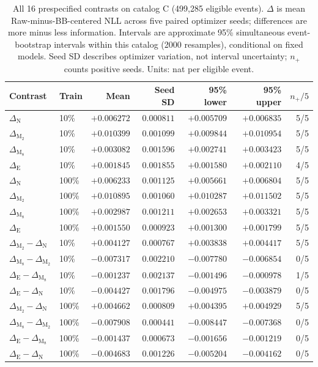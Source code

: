 \begin{table}[!htbp]
\centering
\normalsize
\setlength{\tabcolsep}{3pt}
\caption{All 16 prespecified contrasts on catalog C (499,285 eligible events). $\Delta$ is mean Raw-minus-BB-centered NLL across five paired optimizer seeds; differences are more minus less information. Intervals are approximate 95\% simultaneous event-bootstrap intervals within this catalog (2000 resamples), conditional on fixed models. Seed SD describes optimizer variation, not interval uncertainty; $n_+$ counts positive seeds. Units: nat per eligible event.}
\label{tab:information-C-primary16}
\begin{tabular}{llrrrrr}
\toprule
Contrast & Train & Mean & Seed SD & 95\% lower & 95\% upper & $n_+/5$ \\
\midrule
$\Delta_{\mathrm{N}}$ & 10\% & $+0.006272$ & $0.000811$ & $+0.005709$ & $+0.006835$ & 5/5 \\
$\Delta_{\mathrm{M_2}}$ & 10\% & $+0.010399$ & $0.001099$ & $+0.009844$ & $+0.010954$ & 5/5 \\
$\Delta_{\mathrm{M_8}}$ & 10\% & $+0.003082$ & $0.001596$ & $+0.002741$ & $+0.003423$ & 5/5 \\
$\Delta_{\mathrm{E}}$ & 10\% & $+0.001845$ & $0.001855$ & $+0.001580$ & $+0.002110$ & 4/5 \\
\midrule
$\Delta_{\mathrm{N}}$ & 100\% & $+0.006233$ & $0.001125$ & $+0.005661$ & $+0.006804$ & 5/5 \\
$\Delta_{\mathrm{M_2}}$ & 100\% & $+0.010895$ & $0.001060$ & $+0.010287$ & $+0.011502$ & 5/5 \\
$\Delta_{\mathrm{M_8}}$ & 100\% & $+0.002987$ & $0.001211$ & $+0.002653$ & $+0.003321$ & 5/5 \\
$\Delta_{\mathrm{E}}$ & 100\% & $+0.001550$ & $0.000923$ & $+0.001300$ & $+0.001799$ & 5/5 \\
\midrule
$\Delta_{\mathrm{M_2}}-\Delta_{\mathrm{N}}$ & 10\% & $+0.004127$ & $0.000767$ & $+0.003838$ & $+0.004417$ & 5/5 \\
$\Delta_{\mathrm{M_8}}-\Delta_{\mathrm{M_2}}$ & 10\% & $-0.007317$ & $0.002210$ & $-0.007780$ & $-0.006854$ & 0/5 \\
$\Delta_{\mathrm{E}}-\Delta_{\mathrm{M_8}}$ & 10\% & $-0.001237$ & $0.002137$ & $-0.001496$ & $-0.000978$ & 1/5 \\
$\Delta_{\mathrm{E}}-\Delta_{\mathrm{N}}$ & 10\% & $-0.004427$ & $0.001796$ & $-0.004975$ & $-0.003879$ & 0/5 \\
\midrule
$\Delta_{\mathrm{M_2}}-\Delta_{\mathrm{N}}$ & 100\% & $+0.004662$ & $0.000809$ & $+0.004395$ & $+0.004929$ & 5/5 \\
$\Delta_{\mathrm{M_8}}-\Delta_{\mathrm{M_2}}$ & 100\% & $-0.007908$ & $0.000441$ & $-0.008447$ & $-0.007368$ & 0/5 \\
$\Delta_{\mathrm{E}}-\Delta_{\mathrm{M_8}}$ & 100\% & $-0.001437$ & $0.000673$ & $-0.001656$ & $-0.001219$ & 0/5 \\
$\Delta_{\mathrm{E}}-\Delta_{\mathrm{N}}$ & 100\% & $-0.004683$ & $0.001226$ & $-0.005204$ & $-0.004162$ & 0/5 \\
\bottomrule
\end{tabular}
\end{table}
